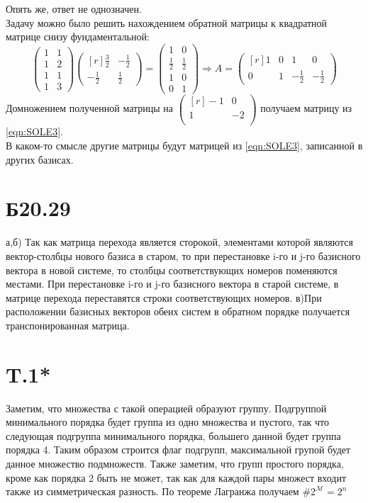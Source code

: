 \documentclass[a4paper,12pt]{article} %
\begin{document}
Опять же, ответ не однозначен.\\
Задачу можно было решить нахождением обратной матрицы к квадратной матрице снизу фундаментальной:
$$\begin{pmatrix*}
1&1\\
1&2\\
1&1\\
1&3
\end{pmatrix*}{\begin{pmatrix*}[r]
\frac{3}{2}&-\frac{1}{2}\\
-\frac{1}{2}&\frac{1}{2}
\end{pmatrix*}}=\begin{pmatrix*}
1&0\\
\frac{1}{2}&\frac{1}{2}\\
1&0\\
0&1
\end{pmatrix*}\Rightarrow A=\begin{pmatrix*}[r]
1&0&1&0\\
0&1&-\frac{1}{2}&-\frac{1}{2}
\end{pmatrix*}$$
Домножением полученной матрицы на $\begin{pmatrix*}[r]
-1&0\\
1&-2\\
\end{pmatrix*}$
получаем матрицу из \eqref{eqn:SOLE3}. \\
В каком-то смысле другие матрицы будут матрицей из \eqref{eqn:SOLE3}, записанной в других базисах.
\section*{Б20.29}
а,б) Так как матрица перехода является сторокой, элементами которой являются вектор-столбцы нового базиса в старом, то  при перестановке i-го и j-го базисного вектора в новой системе, то столбцы соответствующих номеров поменяются местами. При перестановке i-го и j-го базисного вектора в старой системе, в матрице перехода переставятся строки соответствующих номеров.
в)При расположении базисных векторов обеих систем в обратном порядке получается транспонированная матрица.
\section*{T.1*}
Заметим, что множества с такой операцией образуют группу. Подгруппой минимального порядка будет группа из одно множества и пустого, так что следующая подгруппа минимального порядка, большего данной будет группа порядка 4. Таким образом строится флаг подгрупп, максимальной групой будет данное множество подмножеств. Также заметим, что групп простого порядка, кроме как порядка 2 быть не может, так как для каждой пары множест входит также из симметрическая разность. По теореме Лагранжа получаем $\#2^\mathcal{M}=2^n$
\end{document}
